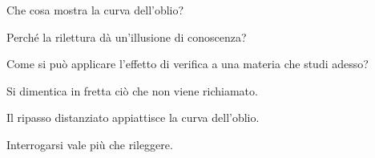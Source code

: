 \begin{domande}
  \item Che cosa mostra la curva dell'oblio?
  \item Perché la rilettura dà un'illusione di conoscenza?
  \item Come si può applicare l'effetto di verifica a una materia
        che studi adesso?
\end{domande}

\begin{sintesi}
  \item Si dimentica in fretta ciò che non viene richiamato.
  \item Il ripasso distanziato appiattisce la curva dell'oblio.
  \item Interrogarsi vale più che rileggere.
\end{sintesi}

\finecapitolo
